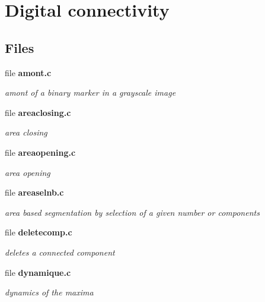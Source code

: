 \section{Digital connectivity}
\label{group__connect}
\subsection*{Files}
\begin{CompactItemize}
\item 
file {\bf amont.c}
\begin{CompactList}\small\item\em amont of a binary marker in a grayscale image \item\end{CompactList}

\item 
file {\bf areaclosing.c}
\begin{CompactList}\small\item\em area closing \item\end{CompactList}

\item 
file {\bf areaopening.c}
\begin{CompactList}\small\item\em area opening \item\end{CompactList}

\item 
file {\bf areaselnb.c}
\begin{CompactList}\small\item\em area based segmentation by selection of a given number or components \item\end{CompactList}

\item 
file {\bf deletecomp.c}
\begin{CompactList}\small\item\em deletes a connected component \item\end{CompactList}

\item 
file {\bf dynamique.c}
\begin{CompactList}\small\item\em dynamics of the maxima \item\end{CompactList}


\end{CompactItemize}
